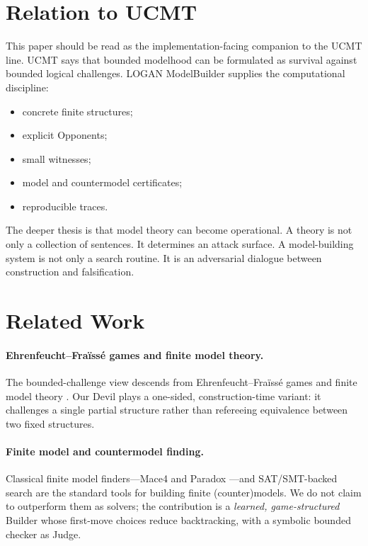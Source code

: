 \documentclass[11pt]{article}
\newcommand{\LOGAN}{\textsc{LOGAN}}
\begin{document}
\section{Relation to UCMT}

This paper should be read as the implementation-facing companion to the UCMT line.  UCMT says that bounded modelhood can be formulated as survival against bounded logical challenges.  \LOGAN{} ModelBuilder supplies the computational discipline:
\begin{itemize}[leftmargin=2em]
  \item concrete finite structures;
  \item explicit Opponents;
  \item small witnesses;
  \item model and countermodel certificates;
  \item reproducible traces.
\end{itemize}

The deeper thesis is that model theory can become operational.  A theory is not only a collection of sentences.  It determines an attack surface.  A model-building system is not only a search routine.  It is an adversarial dialogue between construction and falsification.

\section{Related Work}

\paragraph{Ehrenfeucht--Fra\"iss\'e games and finite model theory.}
The bounded-challenge view descends from Ehrenfeucht--Fra\"iss\'e games \cite{Ehrenfeucht1961,Fraisse1954} and finite model theory \cite{Libkin2004}.  Our Devil plays a one-sided, construction-time variant: it challenges a single partial structure rather than refereeing equivalence between two fixed structures.

\paragraph{Finite model and countermodel finding.}
Classical finite model finders---Mace4 \cite{McCune2003} and Paradox \cite{ClaessenSorensson2003}---and SAT/SMT-backed search are the standard tools for building finite (counter)models.  We do not claim to outperform them as solvers; the contribution is a \emph{learned, game-structured} Builder whose first-move choices reduce backtracking, with a symbolic bounded checker as Judge.
\end{document}
